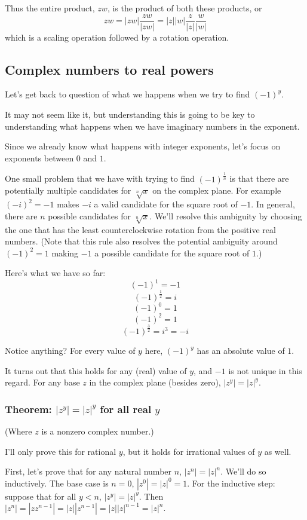 \documentclass[11pt, oneside]{article}   	%
\begin{document}
Thus the entire product, \(zw\), is the product of both these products, or \[zw=|zw|\frac{zw}{|zw|}=|z||w|\frac{z}{|z|}\frac{w}{|w|}\]
which is a scaling operation followed by a rotation operation.

\subsection{Complex numbers to real powers}
Let's get back to question of what we happens when we try to find $(-1)^y$.

It may not seem like it, but understanding this is going to be key to understanding what happens when we have imaginary numbers in the exponent.

Since we already know what happens with integer exponents, let's focus on exponents between $0$ and $1$.

One small problem that we have with trying to find $(-1)^\frac{1}{n}$ is that there are potentially multiple candidates for $\sqrt[n]{x}$ on the complex plane. For example $(-i)^2=-1$ makes $-i$ a valid candidate for the square root of $-1$. In general, there are $n$ possible candidates for $\sqrt[n]{x}$. We'll resolve this ambiguity by choosing the one that has the least counterclockwise rotation from the positive real numbers. (Note that this rule also resolves the potential ambiguity around $(-1)^2=1$ making $-1$ a possible candidate for the square root of $1$.)

Here's what we have so far:
\[(-1)^1 = -1\]
\[(-1)^\frac{1}{2} = i\]
\[(-1)^0 = 1\]
\[(-1)^2 = 1\]
\[(-1)^\frac{3}{2} = i^3=-i\]

Notice anything? For every value of $y$ here, $(-1)^y$ has an absolute value of $1$.

It turns out that this holds for any (real) value of $y$, and $-1$ is not unique in this regard. For any base $z$ in the complex plane (besides zero), $|z^y|=|z|^y$.

\subsubsection{Theorem: $|z^y|=|z|^y$ for all real $y$}
(Where $z$ is a nonzero complex number.)

I'll only prove this for rational $y$, but it holds for irrational values of $y$ as well.

First, let's prove that for any natural number $n$, $|z^n|=|z|^n$.
We'll do so inductively. The base case is $n=0$, $|z^0|=|z|^0=1$.
For the inductive step: suppose that for all $y<n$, $|z^y|=|z|^y$. Then \(|z^n|=|zz^{n-1}|=|z||z^{n-1}|=|z||z|^{n-1}=|z|^n\).
\end{document}
